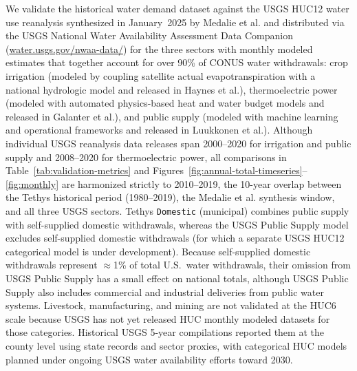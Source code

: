 \documentclass[fleqn,10pt]{wlscirep}
\begin{document}
We validate the historical water demand dataset against the USGS HUC12 water use reanalysis synthesized in January~2025 by Medalie et al.\cite{Stets2025USGS} and distributed via the USGS National Water Availability Assessment Data Companion (\href{https://water.usgs.gov/nwaa-data/}{water.usgs.gov/nwaa-data/}) for the three sectors with monthly modeled estimates that together account for over 90\% of CONUS water withdrawals: crop irrigation (modeled by coupling satellite actual evapotranspiration with a national hydrologic model\cite{Martin2025JoH} and released in Haynes et al.\cite{Haynes2023USGS}), thermoelectric power (modeled with automated physics-based heat and water budget models\cite{Harris2025,skinnerWaterWithdrawalConsumption2025} and released in Galanter et al.\cite{Galanter2023USGS}), and public supply (modeled with machine learning and operational frameworks\cite{Alzraiee2024WRR} and released in Luukkonen et al.\cite{Luukkonen2023USGS}). Although individual USGS reanalysis data releases span 2000--2020 for irrigation\cite{Haynes2023USGS} and public supply\cite{Luukkonen2023USGS} and 2008--2020 for thermoelectric power\cite{Galanter2023USGS}, all comparisons in Table~\ref{tab:validation-metrics} and Figures~\ref{fig:annual-total-timeseries}--\ref{fig:monthly} are harmonized strictly to 2010--2019, the 10-year overlap between the Tethys historical period (1980--2019), the Medalie et al.\cite{Stets2025USGS} synthesis window, and all three USGS sectors. Tethys \texttt{Domestic} (municipal) combines public supply with self-supplied domestic withdrawals, whereas the USGS Public Supply model excludes self-supplied domestic withdrawals (for which a separate USGS HUC12 categorical model is under development). Because self-supplied domestic withdrawals represent $\approx$1\% of total U.S.\ water withdrawals\cite{Dieter2018USGS}, their omission from USGS Public Supply has a small effect on national totals, although USGS Public Supply also includes commercial and industrial deliveries from public water systems. Livestock, manufacturing, and mining are not validated at the HUC6 scale because USGS has not yet released HUC monthly modeled datasets for those categories. Historical USGS 5-year compilations reported them at the county level using state records and sector proxies\cite{Dieter2018USGS}, with categorical HUC models planned under ongoing USGS water availability efforts toward 2030.
\end{document}
